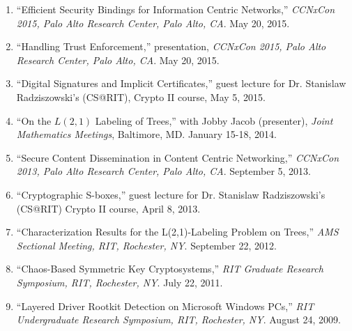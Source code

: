 \documentclass[10pt]{res} %
\begin{document}
\begin{resume}
\begin{enumerate}[T-1.]
\item ``Efficient Security Bindings for Information Centric Networks,'' \emph{CCNxCon 2015, Palo Alto Research Center, Palo Alto, CA}. May 20, 2015.

\item ``Handling Trust Enforcement,'' presentation, \emph{CCNxCon 2015, Palo Alto Research Center, Palo Alto, CA}. May 20, 2015.

\item ``Digital Signatures and Implicit Certificates,'' guest lecture for Dr. Stanislaw Radziszowski's (CS@RIT), Crypto II course, May 5, 2015.

\item ``On the $L(2,1)$ Labeling of Trees,'' with Jobby Jacob (presenter), \emph{Joint Mathematics Meetings}, Baltimore, MD. January 15-18, 2014.

\item ``Secure Content Dissemination in Content Centric Networking,'' \emph{CCNxCon 2013, Palo Alto Research Center, Palo Alto, CA}. September 5, 2013.

\item ``Cryptographic S-boxes,'' guest lecture for Dr. Stanislaw Radziszowski's (CS@RIT) Crypto II course, April 8, 2013.

\item ``Characterization Results for the L(2,1)-Labeling Problem on Trees,'' \emph{AMS Sectional Meeting, RIT, Rochester, NY}. September 22, 2012.

\item ``Chaos-Based Symmetric Key Cryptosystems,'' \emph{RIT Graduate Research Symposium, RIT, Rochester, NY}. July 22, 2011.

\item ``Layered Driver Rootkit Detection on Microsoft Windows PCs,'' \emph{RIT Undergraduate Research Symposium, RIT, Rochester, NY}. August 24, 2009.
\end{enumerate}
\vspace*{-16pt}





\end{resume}
\end{document}

